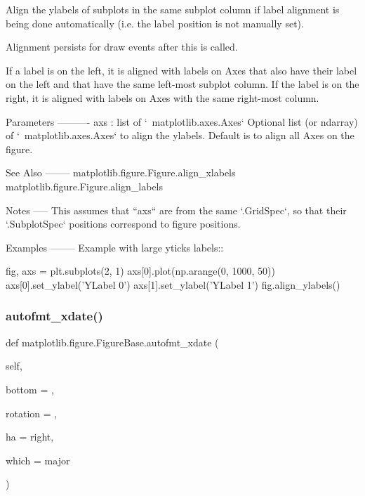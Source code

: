 \begin{DoxyVerb}Align the ylabels of subplots in the same subplot column if label
alignment is being done automatically (i.e. the label position is
not manually set).

Alignment persists for draw events after this is called.

If a label is on the left, it is aligned with labels on Axes that
also have their label on the left and that have the same
left-most subplot column.  If the label is on the right,
it is aligned with labels on Axes with the same right-most column.

Parameters
----------
axs : list of `~matplotlib.axes.Axes`
    Optional list (or ndarray) of `~matplotlib.axes.Axes`
    to align the ylabels.
    Default is to align all Axes on the figure.

See Also
--------
matplotlib.figure.Figure.align_xlabels
matplotlib.figure.Figure.align_labels

Notes
-----
This assumes that ``axs`` are from the same `.GridSpec`, so that
their `.SubplotSpec` positions correspond to figure positions.

Examples
--------
Example with large yticks labels::

    fig, axs = plt.subplots(2, 1)
    axs[0].plot(np.arange(0, 1000, 50))
    axs[0].set_ylabel('YLabel 0')
    axs[1].set_ylabel('YLabel 1')
    fig.align_ylabels()
\end{DoxyVerb}
 \mbox{\label{classmatplotlib_1_1figure_1_1FigureBase_aff4462189d88243c3cd2c8483e7112e6}} 
\subsubsection{\texorpdfstring{autofmt\+\_\+xdate()}{autofmt\_xdate()}}
{\footnotesize\ttfamily def matplotlib.\+figure.\+Figure\+Base.\+autofmt\+\_\+xdate (\begin{DoxyParamCaption}\item[{}]{self,  }\item[{}]{bottom = {},  }\item[{}]{rotation = {},  }\item[{}]{ha = {\ttfamily \textquotesingle{}right\textquotesingle{}},  }\item[{}]{which = {\ttfamily \textquotesingle{}major\textquotesingle{}} }\end{DoxyParamCaption})}

